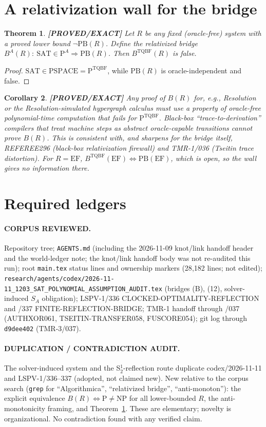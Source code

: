 \documentclass[11pt]{article}
\newtheorem{theorem}{Theorem}
\newtheorem{corollary}[theorem]{Corollary}
\theoremstyle{definition}
\theoremstyle{remark}
\newcommand{\SAT}{\mathrm{SAT}}
\newcommand{\PB}{\mathrm{PB}}
\newcommand{\status}[1]{\textbf{[#1]}}
\begin{document}
\section{A relativization wall for the bridge}
\begin{theorem}\label{thm:rel}\status{PROVED/EXACT}
Let $R$ be any fixed (oracle-free) system with a proved lower bound $\neg\PB(R)$. Define the relativized bridge
$B^A(R):\ \SAT\in\mathrm P^A\Rightarrow\PB(R)$. Then $B^{\mathrm{TQBF}}(R)$ is false.
\end{theorem}
\begin{proof}$\SAT\in\mathrm{PSPACE}=\mathrm P^{\mathrm{TQBF}}$, while $\PB(R)$ is oracle-independent and false.\end{proof}

\begin{corollary}\status{PROVED/EXACT}
Any proof of $B(R)$ for, e.g., Resolution or the Resolution-simulated hypergraph calculus must use a property of
\emph{oracle-free} polynomial-time computation that fails for $\mathrm P^{\mathrm{TQBF}}$. Black-box ``trace-to-derivation''
compilers that treat machine steps as abstract oracle-capable transitions cannot prove $B(R)$. This is consistent with,
and sharpens for the bridge itself, REFEREE296 (black-box relativization firewall) and TMR-1/036 (Tseitin trace distortion).
For $R=\mathrm{EF}$, $B^{\mathrm{TQBF}}(\mathrm{EF})\iff\PB(\mathrm{EF})$, which is open, so the wall gives no information there.
\end{corollary}

\section{Required ledgers}
\paragraph{CORPUS REVIEWED.} Repository tree; \texttt{AGENTS.md} (including the 2026-11-09 knot/link handoff header and the
world-ledger note; the knot/link handoff body was not re-audited this run); root \texttt{main.tex} status lines and ownership
markers (28{,}182 lines; not edited); \texttt{research/agents/codex/2026-11-11\_1203\_SAT\_POLYNOMIAL\_ASSUMPTION\_AUDIT.tex}
(bridges (B), (12), solver-induced $S_A$ obligation); LSPV-1/336 CLOCKED-OPTIMALITY-REFLECTION and /337 FINITE-REFLECTION-BRIDGE;
TMR-1 handoff through /037 (AUTHXOR061, TSEITIN-TRANSFER058, FUSCORE054); git log through \texttt{d9dee402} (TMR-3/037).
\paragraph{DUPLICATION / CONTRADICTION AUDIT.} The solver-induced system and the S$^1_2$-reflection route duplicate
codex/2026-11-11 and LSPV-1/336--337 (adopted, not claimed new). New relative to the corpus search (\texttt{grep} for
``Algorithmica'', ``relativized bridge'', ``anti-monoton''): the explicit equivalence $B(R)\iff \mathrm P\ne\mathrm{NP}$ for
all lower-bounded $R$, the anti-monotonicity framing, and Theorem~\ref{thm:rel}. These are elementary; novelty is
organizational. No contradiction found with any verified claim.
\end{document}
